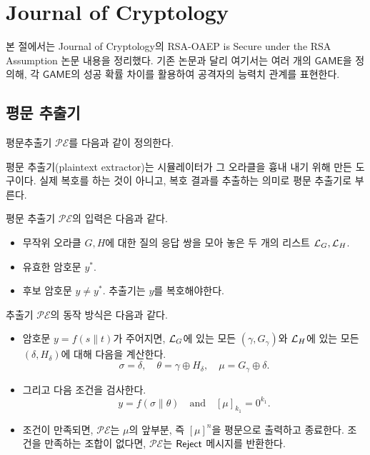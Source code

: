 
\section{Journal of Cryptology}

\newcommand{\game}{\textsf{GAME}}
\newcommand{\pe}{\mathcal{PE}}
\newcommand{\glist}{\mathcal{L}_{G}}
\newcommand{\hlist}{\mathcal{L}_{H}}

본 절에서는 Journal of Cryptology의 RSA-OAEP is Secure under the RSA Assumption
논문 내용을 정리했다. 기존 논문과 달리 여기서는 여러 개의 $\game$을 정의해, 각
$\game$의 성공 확률 차이를 활용하여 공격자의 능력치 관계를 표현한다.


\subsection{평문 추출기}

평문추출기 $\pe$를 다음과 같이 정의한다.

\begin{memo}
	평문 추출기(plaintext extractor)는 시뮬레이터가 그 오라클을 흉내 내기 위해
	만든 도구이다. 실제 복호를 하는 것이 아니고, 복호 결과를 추출하는 의미로
	평문 추출기로 부른다.
\end{memo}

\begin{tcolorbox}
	평문 추출기 $\pe$의 입력은 다음과 같다.
	\begin{itemize}
		\item 무작위 오라클 $G, H$에 대한 질의 응답 쌍을 모아 놓은 두 개의
		리스트 $\mathcal{L}_{G}, \mathcal{L}_{H}$.
		\item 유효한 암호문 $y^*$.
		\item 후보 암호문 $y \ne y^*$. 추출기는 $y$를 복호해야한다.
	\end{itemize}
	추출기 $\pe$의 동작 방식은 다음과 같다.
	\begin{itemize}
		\item 암호문 $y = f(s \parallel t)$가 주어지면, $\mathcal{L}_{G}$에 있는 모든
		$(\gamma, G_\gamma)$와 $\mathcal{L}_{H}$에 있는 모든 $(\delta, H_\delta)$에 대해
		다음을 계산한다. 
		$$
		\sigma = \delta,\quad \theta = \gamma \oplus H_\delta,\quad \mu = G_\gamma \oplus \delta.
		$$
		\item 그리고 다음 조건을 검사한다.
		$$
			y = f(\sigma \parallel \theta) \quad \text{and} \quad [\mu]_{k_1} = 0^{k_1}.
		$$
		\item 조건이 만족되면, $\pe$는 $\mu$의 앞부분, 즉 $[\mu]^n$을 평문으로
		출력하고 종료한다. 조건을 만족하는 조합이 없다면, $\pe$는 $\textsf{Reject}$
		메시지를 반환한다.
	\end{itemize}
\end{tcolorbox}


